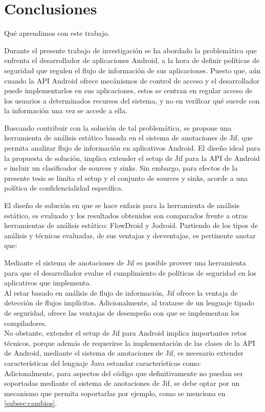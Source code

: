 \section{Conclusiones}
Qué aprendimos con este trabajo.\newline

Durante el presente trabajo de investigación se ha abordado la problemática que
enfrenta el desarrollador de aplicaciones Android, a la hora de definir políticas de
seguridad que regulen el flujo de información de sus aplicaciones. Puesto que,
aún cuando la API Android ofrece mecánismos de control de acceso y el
desarrollador puede implementarlos en sus aplicaciones, estos se centran en
regular acceso de los usuarios a determinados recursos del sistema, y no en
veríficar qué sucede con la información una vez se accede a ella.

Buscando contribuir con la solución de tal problemática, se propone una
herramienta de análisis estático basada en el sistema de anotaciones de Jif, que
permita analizar flujo de información en aplicativos Android. El diseño ideal
para la propuesta de solución, implica extender el setup de Jif para la API de
Android e incluir un clasificador de sources y sinks. Sin embargo, para efectos
de la presente tesis se limíta el setup y el conjunto de sources y sinks, acorde
a una política de confidencialidad específica.

El diseño de solución en que se hace enfasis para la herramienta de análisis
estático, es evaluado y los resultados obtenidos son comparados frente a otras
herramientas de análisis estático: FlowDroid y Jodroid. Partiendo de los tipos
de análisis y técnicas evaluadas, de sus ventajas y desventajas, es pertinente
anotar que:

Mediante el sistema de anotaciones de Jif es posible proveer una herramienta
para que el desarrollador evalue el cumplimiento de políticas de seguridad en
los aplicativos que implementa.\\
Al estar basado en análisis de flujo de información, Jif ofrece la ventaja de
detección de flujos implícitos. Adicionalmente, al tratarse de un lenguaje
tipado de seguridad, ofrece las ventajas de desempeño con que se implementan los
compiladores.\\
No obstante, extender el setup de Jif para Android implica importantes retos
técnicos, porque además de requerirse la implementación de las clases de la API
de Android, mediante el sistema de anotaciones de Jif, es necesario extender
características del lenguaje Java estandar características como:\\
Adicionalmente, para aspectos del código que definitivamente no puedan ser
soportadas mediante el sistema de anotaciones de Jif, se debe optar por un
mecanismo que permita soportarlas por ejemplo, como se menciona en
\ref{subsec:cambios}.


